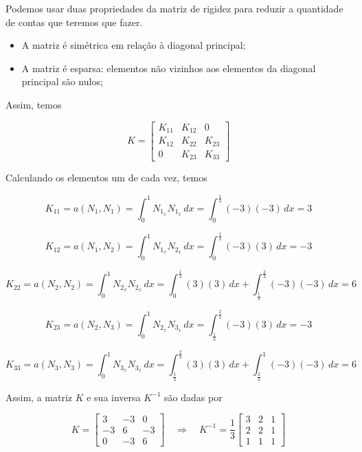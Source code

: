 \documentclass[12pt]{scrartcl}
\newcommand{\logo}{\quad \Rightarrow \quad}
\begin{document}
Podemos usar duas propriedades da matriz de rigidez para reduzir a quantidade de contas que teremos que fazer.
\begin{itemize}
    \item A matriz é simétrica em relação à diagonal principal;
    \item A matriz é esparsa: elementos não vizinhos aos elementos da diagonal principal são nulos;
\end{itemize}

Assim, temos

\begingroup
\renewcommand*{\arraystretch}{2}

\[
    K =
    \begin{bmatrix}
        K_{11} & K_{12} & 0      \\
        K_{12} & K_{22} & K_{23} \\
        0      & K_{23} & K_{33}
    \end{bmatrix}
\]

\endgroup

Calculando os elementos um de cada vez, temos

\[
    K_{11} = a\left(N_1, N_1\right) = \int_{0}^{1} N_{1_x} N_{1_x} \, dx = \int_{0}^{\frac{1}{3}} (-3) (-3) \, dx = 3
\]

\[
    K_{12} = a\left(N_1, N_2\right) = \int_{0}^{1} N_{1_x} N_{2_x} \, dx = \int_{0}^{\frac{1}{3}} (-3) (3) \, dx = - 3
\]

\[
    K_{22} = a\left(N_2, N_2\right) = \int_{0}^{1} N_{2_x} N_{2_x} \, dx =
    \int_{0}^{\frac{1}{3}} (3) (3) \, dx + \int_{\frac{1}{3}}^{\frac{2}{3}} (-3) (-3) \, dx  = 6
\]

\[
    K_{23} = a\left(N_2, N_3\right) = \int_{0}^{1} N_{2_x} N_{3_x} \, dx =
    \int_{\frac{1}{3}}^{\frac{2}{3}} (-3) (3) \, dx  = -3
\]

\[
    K_{33} = a\left(N_3, N_3\right) = \int_{0}^{1} N_{3_x} N_{3_x} \, dx =
    \int_{\frac{1}{3}}^{\frac{2}{3}} (3) (3) \, dx + \int_{\frac{2}{3}}^{1} (-3) (-3) \, dx  = 6
\]

Assim, a matriz $K$ e sua inversa $K^{-1}$ são dadas por

\begingroup
\renewcommand*{\arraystretch}{2}

\[
    K =
    \begin{bmatrix}
        3  & -3 & 0  \\
        -3 & 6  & -3 \\
        0  & -3 & 6
    \end{bmatrix}
    \logo K^{-1} = \frac{1}{3}
    \begin{bmatrix}
        3  & 2 & 1  \\
        2 & 2  & 1 \\
        1  & 1 & 1
    \end{bmatrix}
\]
\end{document}
